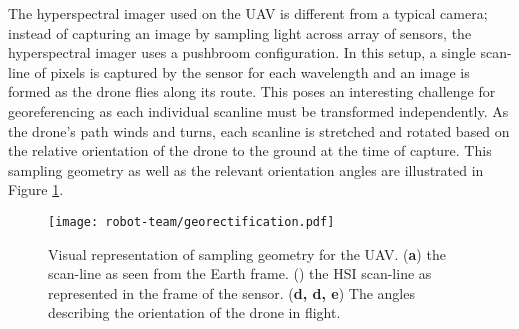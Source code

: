 The hyperspectral imager used on the UAV is different from a typical camera;
instead of capturing an image by sampling light across array of sensors, the
hyperspectral imager uses a pushbroom configuration. In this setup, a single
scan-line of pixels is captured by the sensor for each wavelength and an image
is formed as the drone flies along its route. This poses an interesting
challenge for georeferencing as each individual scanline must be transformed
independently. As the drone's path winds and turns, each scanline
is stretched and rotated based on the relative orientation of
the drone to the ground at the time of capture. This sampling geometry as well
as the relevant orientation angles are illustrated in Figure
\ref{fig:georectification}.

\begin{figure}[h]
  \centering
  \texttt{[image: robot-team/georectification.pdf]}
  \caption{Visual representation of sampling geometry for the UAV. (\textbf{a})
    the scan-line as seen from the Earth frame. () the HSI scan-line as
    represented in the frame of the sensor. (\textbf{d, d, e}) The angles
    describing the orientation of the drone in flight.}
  \label{fig:georectification}
\end{figure}

